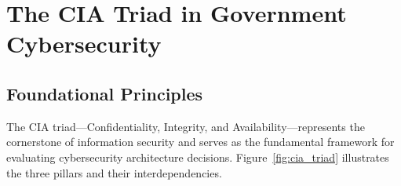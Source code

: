 \documentclass[sigconf,nonacm]{acmart}
\begin{document}
\section{The CIA Triad in Government Cybersecurity}

\subsection{Foundational Principles}

The CIA triad---Confidentiality, Integrity, and Availability---represents the cornerstone
of information security and serves as the fundamental framework for evaluating
cybersecurity architecture decisions. Figure~\ref{fig:cia_triad} illustrates the
three pillars and their interdependencies.
\end{document}
